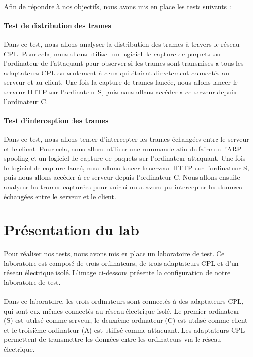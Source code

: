 \documentclass[a4paper,twocolumn]{report}
\begin{document}
\paragraph{}Afin de répondre à nos objectifs, nous avons mis en place les tests suivants :
\paragraph{Test de distribution des trames} Dans ce test, nous allons analyser la distribution
des trames à travers le réseau CPL. Pour cela, nous allons utiliser un logiciel de capture
de paquets sur l'ordinateur de l'attaquant pour observer si les trames sont transmises à tous
les adaptateurs CPL ou seulement à ceux qui étaient directement connectés au serveur et au client.
Une fois la capture de trames lancée, nous allons lancer le serveur HTTP sur l'ordinateur S,
puis nous allons accéder à ce serveur depuis l'ordinateur C.

\paragraph{Test d'interception des trames} Dans ce test, nous allons tenter d'intercepter
les trames échangées entre le serveur et le client. Pour cela, nous allons utiliser une commande
afin de faire de l'ARP spoofing et un logiciel de capture de paquets sur l'ordinateur attaquant.
Une fois le logiciel de capture lancé, nous allons lancer le serveur HTTP sur l'ordinateur S,
puis nous allons accéder à ce serveur depuis l'ordinateur C. Nous allons ensuite analyser
les trames capturées pour voir si nous avons pu intercepter les données échangées entre le serveur et le client.

\section{Présentation du lab}
\paragraph{}Pour réaliser nos tests, nous avons mis en place un laboratoire de test.
Ce laboratoire est composé de trois ordinateurs, de trois adaptateurs CPL et d'un réseau électrique isolé.
L'image ci-dessous présente la configuration de notre laboratoire de test.
\paragraph{}Dans ce laboratoire, les trois ordinateurs sont connectés à des adaptateurs CPL,
qui sont eux-mêmes connectés au réseau électrique isolé. Le premier ordinateur (S) est utilisé comme serveur,
le deuxième ordinateur (C) est utilisé comme client et le troisième ordinateur (A) est utilisé comme attaquant.
Les adaptateurs CPL permettent de transmettre les données entre les ordinateurs via le réseau électrique.
\end{document}
